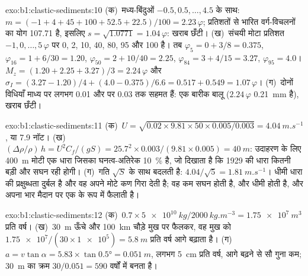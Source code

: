 \begin{solution}{exo:b1:clastic-sediments:10}
(क)~मध्य-बिंदुओं $-0.5, 0.5, \ldots, 4.5$ के साथ: $m = (-1 + 4 + 45 + 100 + 52.5
+ 22.5)/100 = 2.23\,\varphi$; प्रतिशतों से भारित वर्ग-विचलनों का योग \num{107.71} है, इसलिए $s = \sqrt{1.0771} = 1.04\,\varphi$:
खराब छँटी। (ख)~संचयी मोटा प्रतिशत $-1, 0, \ldots, 5\,\varphi$ पर 0, 2, 10, 40, 80, 95 और
100 है। तब $\varphi_5 = 0 + 3/8 = 0.375$,
$\varphi_{16} = 1 + 6/30 = 1.20$, $\varphi_{50} = 2 + 10/40 = 2.25$,
$\varphi_{84} = 3 + 4/15 = 3.27$, $\varphi_{95} = 4.0$। $M_z = (1.20 + 2.25 +
3.27)/3 = 2.24\,\varphi$ और $\sigma_I = (3.27 - 1.20)/4 + (4.0 - 0.375)/6.6 =
0.517 + 0.549 = 1.07\,\varphi$। (ग)~दोनों विधियाँ माध्य पर लगभग \num{0.01} और  पर \num{0.03} तक सहमत हैं: एक बारीक बालू
($2.24\,\varphi$ \qty{0.21}{mm} है), खराब छँटी।
\end{solution}

\begin{solution}{exo:b1:clastic-sediments:11}
(क)~$U = \sqrt{0.02 \times 9.81 \times 50 \times 0.005/0.003} =
\qty{4.04}{m.s^{-1}}$, या 7.9 नॉट। (ख)~$(\Delta\rho/\rho)\,h = U^2
C_f/(gS) = 25.7^2 \times 0.003/(9.81 \times 0.005) = \qty{40}{m}$: उदाहरण के लिए
\qty{400}{m} मोटी एक धारा जिसका घनत्व-अतिरेक \qty{10}{\percent} है, जो दिखाता है कि 1929 की धारा कितनी बड़ी और सघन रही होगी। (ग)~गति $\sqrt S$ के साथ बदलती है: $4.04/\sqrt 5 = \qty{1.81}{m.s^{-1}}$। धीमी धारा की प्रक्षुब्धता दुर्बल है और वह अपने मोटे कण गिरा देती है; वह कम सघन होती है, और धीमी होती है, और अपना भार मैदान पर एक  के रूप में फैलाती है।
\end{solution}

\begin{solution}{exo:b1:clastic-sediments:12}
(क)~$0.7 \times \qty{5e10}{kg}/\qty{2000}{kg.m^{-3}} = \qty{1.75e7}{m^3}$ प्रति
वर्ष। (ख)~\qty{30}{m} ऊँचे और \qty{100}{km} चौड़े मुख पर फैलकर, वह मुख को
$\num{1.75e7}/(30 \times \num{1e5}) = \qty{5.8}{m}$ प्रति
वर्ष आगे बढ़ाता है। (ग)~$a = v\tan\alpha = 5.83 \times \tan\ang{0.5} = \qty{0.051}{m}$, लगभग
\qty{5}{cm} प्रति वर्ष, आगे बढ़ने से सौ गुना कम; \qty{30}{m} का क्रम $30/0.051 = 590$ वर्षों में बनता है।
\end{solution}

